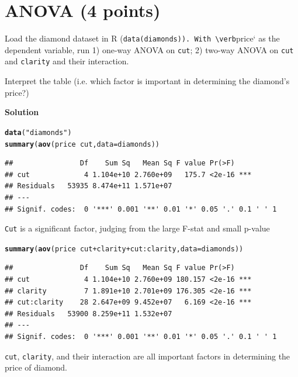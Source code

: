 \documentclass{article}\usepackage[]{graphicx}\usepackage[]{color}
\makeatletter
\newcommand{\hlstr}[1]{\textcolor[rgb]{0.192,0.494,0.8}{#1}}%
\newcommand{\hlopt}[1]{\textcolor[rgb]{0,0,0}{#1}}%
\newcommand{\hlstd}[1]{\textcolor[rgb]{0.345,0.345,0.345}{#1}}%
\newcommand{\hlkwc}[1]{\textcolor[rgb]{0.333,0.667,0.333}{#1}}%
\newcommand{\hlkwd}[1]{\textcolor[rgb]{0.737,0.353,0.396}{\textbf{#1}}}%
\newenvironment{kframe}{%
 \def\at@end@of@kframe{}%
 \ifinner\ifhmode%
  \def\at@end@of@kframe{\end{minipage}}%
  \begin{minipage}{\columnwidth}%
 \fi\fi%
 \def\FrameCommand##1{\hskip\@totalleftmargin \hskip-\fboxsep
 \colorbox{shadecolor}{##1}\hskip-\fboxsep
     \hskip-\linewidth \hskip-\@totalleftmargin \hskip\columnwidth}%
 \MakeFramed {\advance\hsize-\width
   \@totalleftmargin\z@ \linewidth\hsize
   \@setminipage}}%
 {\par\unskip\endMakeFramed%
 \at@end@of@kframe}
\newenvironment{knitrout}{}{} %
\makeatother
\begin{document}
\section{ANOVA (4 points)}

Load the diamond dataset in R (\verb`data(diamonds)). With \verb`price` as the dependent variable, run 1) one-way ANOVA on \verb`cut`; 2) two-way ANOVA on \verb`cut` and \verb`clarity` and their interaction.

Interpret the table (i.e. which factor is important in determining the diamond's price?)

\textbf{Solution}

\begin{knitrout}
\color{fgcolor}\begin{kframe}
\begin{alltt}
\hlkwd{data}\hlstd{(}\hlstr{"diamonds"}\hlstd{)}
\hlkwd{summary}\hlstd{(}\hlkwd{aov}\hlstd{(price} \hlopt{~} \hlstd{cut,} \hlkwc{data} \hlstd{= diamonds))}
\end{alltt}
\begin{verbatim}
##                Df    Sum Sq   Mean Sq F value Pr(>F)    
## cut             4 1.104e+10 2.760e+09   175.7 <2e-16 ***
## Residuals   53935 8.474e+11 1.571e+07                   
## ---
## Signif. codes:  0 '***' 0.001 '**' 0.01 '*' 0.05 '.' 0.1 ' ' 1
\end{verbatim}
\end{kframe}
\end{knitrout}

\verb`Cut` is a significant factor, judging from the large F-stat and small p-value

\begin{knitrout}
\color{fgcolor}\begin{kframe}
\begin{alltt}
\hlkwd{summary}\hlstd{(}\hlkwd{aov}\hlstd{(price} \hlopt{~} \hlstd{cut} \hlopt{+} \hlstd{clarity} \hlopt{+} \hlstd{cut}\hlopt{:}\hlstd{clarity,} \hlkwc{data} \hlstd{= diamonds))}
\end{alltt}
\begin{verbatim}
##                Df    Sum Sq   Mean Sq F value Pr(>F)    
## cut             4 1.104e+10 2.760e+09 180.157 <2e-16 ***
## clarity         7 1.891e+10 2.701e+09 176.305 <2e-16 ***
## cut:clarity    28 2.647e+09 9.452e+07   6.169 <2e-16 ***
## Residuals   53900 8.259e+11 1.532e+07                   
## ---
## Signif. codes:  0 '***' 0.001 '**' 0.01 '*' 0.05 '.' 0.1 ' ' 1
\end{verbatim}
\end{kframe}
\end{knitrout}

\verb`cut`, \verb`clarity`, and their interaction are all important factors in determining the price of diamond.
\end{document}
